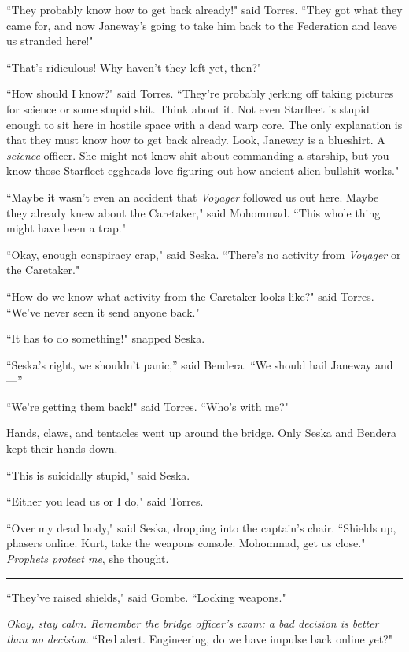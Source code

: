 \documentclass[twoside,letterpaper,12pt]{memoir}
\begin{document}
``They probably know how to get back already!" said Torres. ``They got what they came for, and now Janeway's going to take him back to the Federation and leave us stranded here!"

``That's ridiculous! Why haven't they left yet, then?"

``How should I know?" said Torres. ``They're probably jerking off taking pictures for science or some stupid shit. Think about it. Not even Starfleet is stupid enough to sit here in hostile space with a dead warp core. The only explanation is that they must know how to get back already. Look, Janeway is a blueshirt. A \textit{science} officer. She might not know shit about commanding a starship, but you know those Starfleet eggheads love figuring out how ancient alien bullshit works."

``Maybe it wasn't even an accident that \textit{Voyager} followed us out here. Maybe they already knew about the Caretaker," said Mohommad. ``This whole thing might have been a trap."

``Okay, enough conspiracy crap," said Seska. ``There's no activity from \textit{Voyager} or the Caretaker."

``How do we know what activity from the Caretaker looks like?" said Torres. ``We've never seen it send anyone back."

``It has to do something!" snapped Seska.

``Seska’s right, we shouldn’t panic,'' said Bendera. ``We should hail Janeway and—''

``We're getting them back!" said Torres. ``Who's with me?"

Hands, claws, and tentacles went up around the bridge. Only Seska and Bendera kept their hands down.

``This is suicidally stupid," said Seska.

``Either you lead us or I do," said Torres.

``Over my dead body," said Seska, dropping into the captain's chair. ``Shields up, phasers online. Kurt, take the weapons console. Mohommad, get us close." \textit{Prophets protect me}, she thought.

\begin{center}\rule{3cm}{0.4 pt}\end{center}

\noindent``They've raised shields," said Gombe. ``Locking weapons."

\textit{Okay, stay calm. Remember the bridge officer's exam: a bad decision is better than no decision.} ``Red alert. Engineering, do we have impulse back online yet?"
\end{document}
